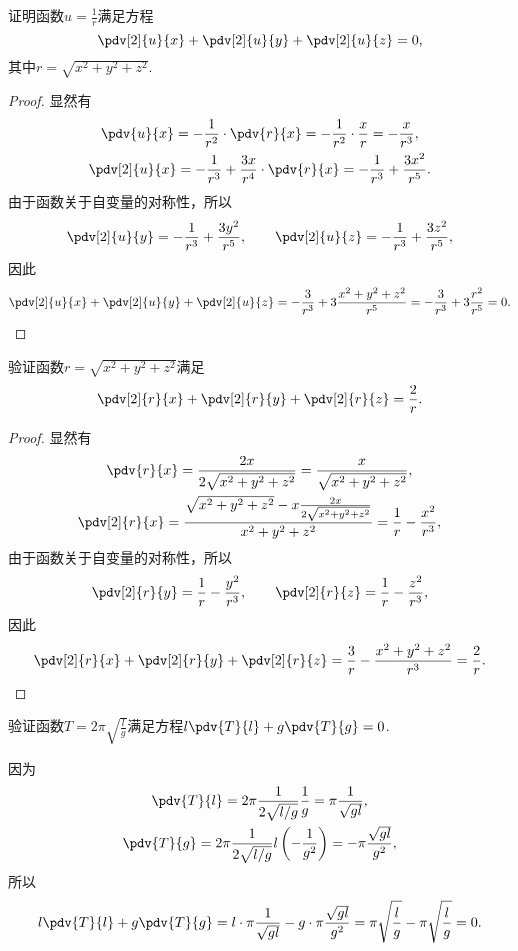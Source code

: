 \begin{example}
证明函数\(u = \frac{1}{r}\)满足方程\[
	\pdv[2]{u}{x} + \pdv[2]{u}{y} + \pdv[2]{u}{z} = 0,
\]
其中\(r = \sqrt{x^2+y^2+z^2}\).
\begin{proof}
显然有\begin{gather*}
	\pdv{u}{x} = -\frac{1}{r^2}\cdot\pdv{r}{x}
	= -\frac{1}{r^2}\cdot\frac{x}{r}
	= -\frac{x}{r^3}, \\
	\pdv[2]{u}{x} = -\frac{1}{r^3} + \frac{3x}{r^4}\cdot\pdv{r}{x}
	= -\frac{1}{r^3} + \frac{3x^2}{r^5}.
\end{gather*}
由于函数关于自变量的对称性，所以\[
	\pdv[2]{u}{y} = -\frac{1}{r^3} + \frac{3y^2}{r^5},
	\qquad
	\pdv[2]{u}{z} = -\frac{1}{r^3} + \frac{3z^2}{r^5},
\]
因此\[
	\pdv[2]{u}{x} + \pdv[2]{u}{y} + \pdv[2]{u}{z}
	= -\frac{3}{r^3} + 3\frac{x^2+y^2+z^2}{r^5}
	= -\frac{3}{r^3} + 3\frac{r^2}{r^5} = 0.
	\qedhere
\]
\end{proof}
\end{example}

\begin{example}
验证函数\(r = \sqrt{x^2+y^2+z^2}\)满足\[
	\pdv[2]{r}{x} + \pdv[2]{r}{y} + \pdv[2]{r}{z} = \frac{2}{r}.
\]
\begin{proof}
显然有\begin{gather*}
	\pdv{r}{x} = \frac{2x}{2\sqrt{x^2+y^2+z^2}} = \frac{x}{\sqrt{x^2+y^2+z^2}}, \\
	\pdv[2]{r}{x} = \frac{\sqrt{x^2+y^2+z^2}-x\frac{2x}{2\sqrt{x^2+y^2+z^2}}}{x^2+y^2+z^2}
	= \frac{1}{r} - \frac{x^2}{r^3},
\end{gather*}
由于函数关于自变量的对称性，所以\[
	\pdv[2]{r}{y} = \frac{1}{r} - \frac{y^2}{r^3},
	\qquad
	\pdv[2]{r}{z} = \frac{1}{r} - \frac{z^2}{r^3},
\]
因此\[
	\pdv[2]{r}{x} + \pdv[2]{r}{y} + \pdv[2]{r}{z}
	= \frac{3}{r} - \frac{x^2+y^2+z^2}{r^3}
	= \frac{2}{r}.
	\qedhere
\]
\end{proof}
\end{example}

\begin{example}
验证函数\(T = 2\pi\sqrt{\frac{l}{g}}\)满足方程\(l\pdv{T}{l}+g\pdv{T}{g}=0\).
\begin{solution}
因为\begin{gather*}
	\pdv{T}{l} = 2\pi \frac{1}{2\sqrt{l/g}} \frac{1}{g}
	= \pi \frac{1}{\sqrt{gl}}, \\
	\pdv{T}{g} = 2\pi \frac{1}{2\sqrt{l/g}} l \left(-\frac{1}{g^2}\right)
	= -\pi \frac{\sqrt{gl}}{g^2},
\end{gather*}
所以\[
	l \pdv{T}{l} + g \pdv{T}{g}
	= l \cdot \pi \frac{1}{\sqrt{gl}} - g \cdot \pi \frac{\sqrt{gl}}{g^2}
	= \pi \sqrt{\frac{l}{g}} - \pi \sqrt{\frac{l}{g}} = 0.
\]
\end{solution}
\end{example}

